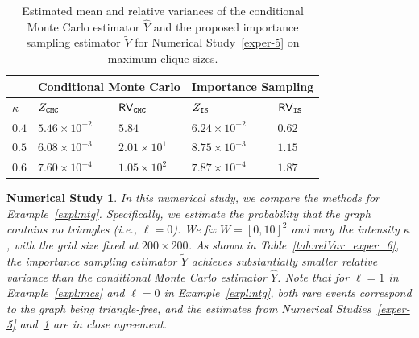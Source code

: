 \documentclass[pdflatex, sn-mathphys-ay]{sn-jnl}%
\newcommand{\wt}{\widetilde}
\newcommand{\wh}{\widehat}
\newtheorem{experiment}{Numerical Study}
\theoremstyle{thmstyleone}%
\theoremstyle{thmstyletwo}%
\theoremstyle{thmstylethree}%
\begin{document}
\begin{table}[h]
 
\caption{Estimated mean and relative variances of the conditional Monte Carlo estimator $\wh Y$ and the proposed importance sampling estimator $\wt Y$ for Numerical Study~\ref{exper-5} on maximum clique sizes.}
\label{tab:relVar_exper_5}
\centering
\begin{tabular}{@{}lllll@{}}
    \hline
      & \multicolumn{2}{l}{Conditional Monte Carlo}
            & \multicolumn{2}{l}{Importance Sampling} \\
    \hline
     $\kappa$  &  $Z_{\tt CMC}$  &  ${\sf RV}_{\tt CMC}$   &   $Z_{\tt IS}$  &  ${\sf RV}_{\tt IS}$ \\
    \hline
$0.4$  &  $5.46 \times 10^{-2}$  &  $5.84$  &  $6.24 \times 10^{-2}$  &  $0.62$  \\
    \hline
$0.5$  &  $6.08 \times 10^{-3}$  &  $2.01 \times 10^{1}$  &  $8.75 \times 10^{-3}$  &  $1.15$  \\
    \hline
$0.6$  &  $7.60 \times 10^{-4}$  &  $1.05 \times 10^{2}$  &  $7.87 \times 10^{-4}$  &  $1.87$  \\
    \hline
\end{tabular}
\end{table}

\begin{experiment}
 
\label{exper-6}
\normalfont
In this numerical study, we compare the methods for Example~\ref{expl:ntg}. Specifically, we estimate the probability that the graph contains no triangles (i.e., $\ell = 0$). We fix $W = [0, 10]^2$ and vary the intensity $\kappa$, with the grid size fixed at $200 \times 200$. As shown in Table~\ref{tab:relVar_exper_6}, the importance sampling estimator $\wt Y$ achieves substantially smaller relative variance than the conditional Monte Carlo estimator $\wh Y$. Note that for $\ell = 1$ in Example~\ref{expl:mcs} and $\ell = 0$ in Example~\ref{expl:ntg}, both rare events correspond to the graph being triangle-free, and the estimates from Numerical Studies~\ref{exper-5} and~\ref{exper-6} are in close agreement.
\end{experiment}
\end{document}
